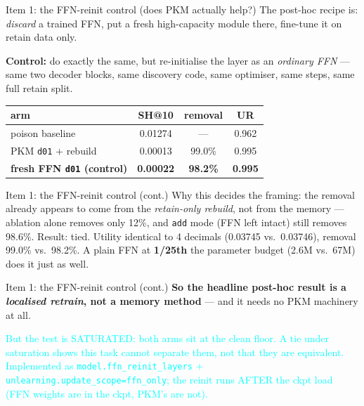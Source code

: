 \documentclass{beamer}
\newcommand{\pierre}[1]{\textcolor{cyan}{#1}}
\begin{document}
\begin{frame}{Item 1: the FFN-reinit control (does PKM actually help?)}
The post-hoc recipe is: \emph{discard} a trained FFN, put a fresh high-capacity
module there, fine-tune it on retain data only.

\medskip
\textbf{Control:} do exactly the same, but re-initialise the layer as an
\emph{ordinary FFN} --- same two decoder blocks, same discovery code, same
optimiser, same steps, same full retain split.
\begin{center}
\begin{tabular}{|l|c|c|c|}
\hline
arm & SH@10 & removal & UR \\
\hline
poison baseline               & 0.01274 & ---    & 0.962 \\
PKM \texttt{d01} $+$ rebuild  & 0.00013 & 99.0\% & 0.995 \\
\textbf{fresh FFN \texttt{d01} (control)} & \textbf{0.00022} & \textbf{98.2\%} & \textbf{0.995} \\
\hline
\end{tabular}
\end{center}

\end{frame}

\begin{frame}{Item 1: the FFN-reinit control (cont.)}
\alert{Why this decides the framing:} the removal already appears to come from
the \emph{retain-only rebuild}, not from the memory --- ablation alone removes
only 12\%, and \texttt{add} mode (FFN left intact) still removes 98.6\%.
\alert{Result: tied.} Utility identical to 4 decimals (0.03745 vs.\ 0.03746),
removal 99.0\% vs.\ 98.2\%. A plain FFN at \textbf{1/25th} the parameter budget
(2.6M vs.\ 67M) does it just as well.

\end{frame}

\begin{frame}{Item 1: the FFN-reinit control (cont.)}
\textbf{So the headline post-hoc result is a \emph{localised retrain}, not a
memory method} --- and it needs no PKM machinery at all.

\medskip
\pierre{But the test is SATURATED: both arms sit at the clean floor. A tie under
saturation shows this task cannot separate them, not that they are equivalent.}
\pierre{Implemented as \texttt{model.ffn\_reinit\_layers} $+$
\texttt{unlearning.update\_scope=ffn\_only}; the reinit runs AFTER the ckpt load
(FFN weights are in the ckpt, PKM's are not).}
\end{frame}
\end{document}
